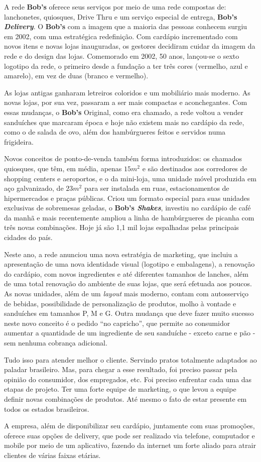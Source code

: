 		A rede \textbf{Bob’s} oferece seus serviços por meio de uma rede compostas de: lanchonetes, quiosques, Drive Thru e um serviço especial de entrega, \textbf{Bob’s \emph{Delivery}}. O \textbf{Bob’s} com a imagem que a maioria das pessoas conhecem surgiu em 2002, com uma estratégica redefinição. Com cardápio incrementado com novos itens e novas lojas inauguradas, os gestores decidiram cuidar da imagem da rede e do design das lojas. Comemorado em 2002, 50 anos, lançou-se o sexto logotipo da rede, o primeiro desde a fundação a ter três cores (vermelho, azul e amarelo), em vez de duas (branco e vermelho). 

		As lojas antigas ganharam letreiros coloridos e um mobiliário mais moderno. As novas lojas, por sua vez, passaram a ser mais compactas e aconchegantes. Com essas mudanças, o \textbf{Bob’s} Original, como era chamado, a rede voltou a vender sanduíches que marcaram época e hoje não existem mais no cardápio da rede, como o de salada de ovo, além dos hambúrgueres feitos e servidos numa frigideira.

		Novos conceitos de ponto-de-venda também forma introduzidos: os chamados quiosques, que têm, em média, apenas $15 m^2$ e são destinados aos corredores de shopping centers e aeroportos, e o da mini-loja, uma unidade móvel produzida em aço galvanizado, de $23 m^2$ para ser instalada em ruas, estacionamentos de hipermercados e praças públicas. Criou um formato especial para suas unidades exclusivas de sobremesas geladas, o \textbf{Bob’s \emph{Shakes}}, investiu no cardápio de café da manhã e mais recentemente ampliou a linha de hambúrgueres de picanha com três novas combinações. Hoje já são 1,1 mil lojas espalhadas pelas principais cidades do país. \cite{lamonica}

		Neste ano, a rede anunciou uma nova estratégia de marketing, que incluiu a apresentação de uma nova identidade visual (logotipo e embalagens), a renovação do cardápio, com novos ingredientes e até diferentes tamanhos de lanches, além de uma total renovação do ambiente de suas lojas, que será efetuada aos poucos. As novas unidades, além de um \emph{layout} mais moderno, contam com autosserviço de bebidas, possibilidade de personalização de produtos, molho à vontade e sanduíches em tamanhos P, M e G. Outra mudança que deve fazer muito sucesso neste novo conceito é o pedido “no capricho”, que permite ao consumidor aumentar a quantidade de um ingrediente de seu sanduíche - exceto carne e pão - sem nenhuma cobrança adicional.

		Tudo isso para atender melhor o cliente. Servindo pratos totalmente adaptados ao paladar brasileiro. Mas, para chegar a esse resultado, foi preciso passar pela opinião do consumidor, dos empregados, etc. Foi preciso enfrentar cada uma das etapas de projeto. Ter uma forte equipe de marketing, o que levou a equipe definir novas combinações de produtos. Até mesmo o fato de estar presente em todos os estados brasileiros. 

		A empresa, além de disponibilizar seu cardápio, juntamente com suas promoções, oferece suas opções de delivery, que pode ser realizado via telefone, computador e mobile por meio de um aplicativo, fazendo da internet um forte aliado para atrair clientes de várias faixas etárias. 